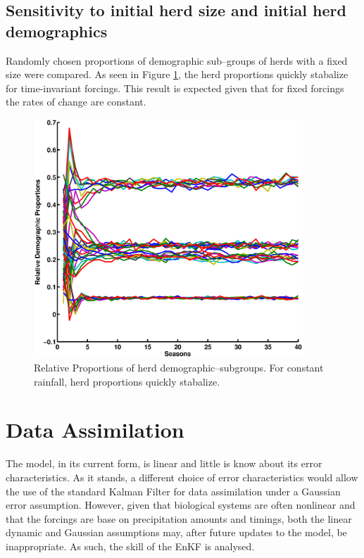 \documentclass[fleqn, letterpaper]{article}
\numberwithin{figure}{section}
\begin{document}
\subsection{Sensitivity to initial herd size and initial herd demographics}
Randomly chosen proportions of demographic sub--groups of herds with a fixed size were compared. As seen in Figure \ref{relprop}, the herd proportions quickly stabalize for time-invariant forcings. This result is expected given that for fixed forcings the rates of change are constant.
\begin{figure}
\includegraphics[width=0.9\textwidth]{relprop}
\caption{Relative Proportions of herd demographic--subgroups. For constant rainfall, herd proportions quickly stabalize.}
\label{relprop}
\end{figure}

\section{Data Assimilation}
The model, in its current form, is linear and little is know about its error characteristics.
As it stands, a different choice of error characteristics would allow the use of the  standard Kalman Filter for data assimilation under a Gaussian error assumption.
However, given that biological systems are often nonlinear and that the forcings are base on precipitation amounts and timings, both the linear dynamic and Gaussian assumptions may, after future updates to the model, be inappropriate.  As such, the skill of the EnKF is analysed. 
\end{document}
